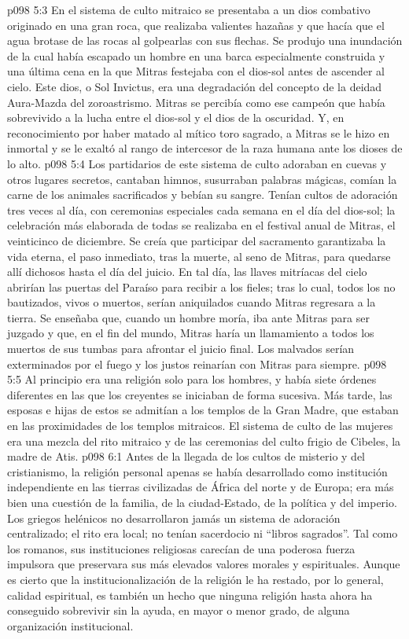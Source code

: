 \vs p098 5:3 \pc En el sistema de culto mitraico se presentaba a un dios combativo originado en una gran roca, que realizaba valientes hazañas y que hacía que el agua brotase de las rocas al golpearlas con sus flechas. Se produjo una inundación de la cual había escapado un hombre en una barca especialmente construida y una última cena en la que Mitras festejaba con el dios\hyp{}sol antes de ascender al cielo. Este dios, o Sol Invictus, era una degradación del concepto de la deidad Aura\hyp{}Mazda del zoroastrismo. Mitras se percibía como ese campeón que había sobrevivido a la lucha entre el dios\hyp{}sol y el dios de la oscuridad. Y, en reconocimiento por haber matado al mítico toro sagrado, a Mitras se le hizo en inmortal y se le exaltó al rango de intercesor de la raza humana ante los dioses de lo alto.
\vs p098 5:4 Los partidarios de este sistema de culto adoraban en cuevas y otros lugares secretos, cantaban himnos, susurraban palabras mágicas, comían la carne de los animales sacrificados y bebían su sangre. Tenían cultos de adoración tres veces al día, con ceremonias especiales cada semana en el día del dios\hyp{}sol; la celebración más elaborada de todas se realizaba en el festival anual de Mitras, el veinticinco de diciembre. Se creía que participar del sacramento garantizaba la vida eterna, el paso inmediato, tras la muerte, al seno de Mitras, para quedarse allí dichosos hasta el día del juicio. En tal día, las llaves mitríacas del cielo abrirían las puertas del Paraíso para recibir a los fieles; tras lo cual, todos los no bautizados, vivos o muertos, serían aniquilados cuando Mitras regresara a la tierra. Se enseñaba que, cuando un hombre moría, iba ante Mitras para ser juzgado y que, en el fin del mundo, Mitras haría un llamamiento a todos los muertos de sus tumbas para afrontar el juicio final. Los malvados serían exterminados por el fuego y los justos reinarían con Mitras para siempre.
\vs p098 5:5 Al principio era una religión solo para los hombres, y había siete órdenes diferentes en las que los creyentes se iniciaban de forma sucesiva. Más tarde, las esposas e hijas de estos se admitían a los templos de la Gran Madre, que estaban en las proximidades de los templos mitraicos. El sistema de culto de las mujeres era una mezcla del rito mitraico y de las ceremonias del culto frigio de Cibeles, la madre de Atis.
\vs p098 6:1 Antes de la llegada de los cultos de misterio y del cristianismo, la religión personal apenas se había desarrollado como institución independiente en las tierras civilizadas de África del norte y de Europa; era más bien una cuestión de la familia, de la ciudad\hyp{}Estado, de la política y del imperio. Los griegos helénicos no desarrollaron jamás un sistema de adoración centralizado; el rito era local; no tenían sacerdocio ni “libros sagrados”. Tal como los romanos, sus instituciones religiosas carecían de una poderosa fuerza impulsora que preservara sus más elevados valores morales y espirituales. Aunque es cierto que la institucionalización de la religión le ha restado, por lo general, calidad espiritual, es también un hecho que ninguna religión hasta ahora ha conseguido sobrevivir sin la ayuda, en mayor o menor grado, de alguna organización institucional.
